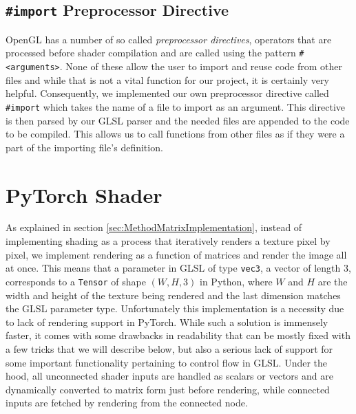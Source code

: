 \subsection{\texttt{\#import} Preprocessor Directive}\label{sec:ImportPreprocessorDirective}

OpenGL has a number of so called \textit{preprocessor directives}, operators that are processed before shader compilation and are called using the pattern \texttt{\#<directive-name> <arguments>}. None of these allow the user to import and reuse code from other files and while that is not a vital function for our project, it is certainly very helpful. Consequently, we implemented our own preprocessor directive called \texttt{\#import} which takes the name of a file to import as an argument. This directive is then parsed by our GLSL parser and the needed files are appended to the code to be compiled. This allows us to call functions from other files as if they were a part of the importing file's definition. 

\section{PyTorch Shader}\label{sec:ImplementationPyTorchShader}

As explained in section \ref{sec:MethodMatrixImplementation}, instead of implementing shading as a process that iteratively renders a texture pixel by pixel, we implement rendering as a function of matrices and render the image all at once. This means that a parameter in GLSL of type \texttt{vec3}, a vector of length 3, corresponds to a \texttt{Tensor} of shape $(W,H,3)$ in Python, where $W$ and $H$ are the width and height of the texture being rendered and the last dimension matches the GLSL parameter type. Unfortunately this implementation is a necessity due to lack of rendering support in PyTorch. While such a solution is immensely faster, it comes with some drawbacks in readability that can be mostly fixed with a few tricks that we will describe below, but also a serious lack of support for some important functionality pertaining to control flow in GLSL. Under the hood, all unconnected shader inputs are handled as scalars or vectors and are dynamically converted to matrix form just before rendering, while connected inputs are fetched by rendering from the connected node. 


